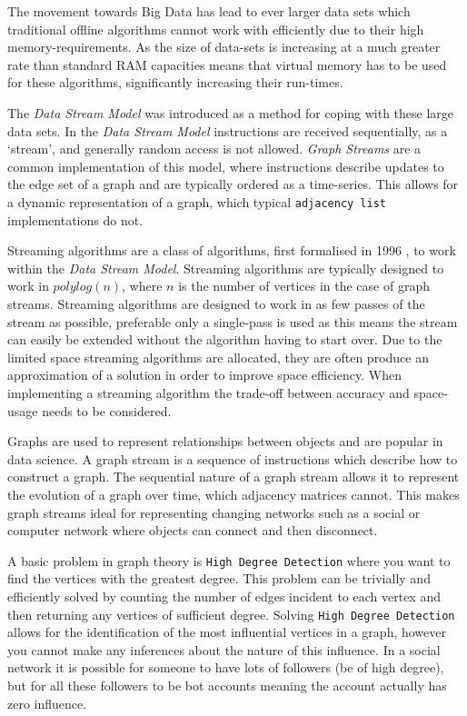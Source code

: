 \documentclass[11pt,twoside,a4paper]{report}
\begin{document}
\par The movement towards Big Data has lead to ever larger data sets which traditional offline algorithms cannot work with efficiently due to their high memory-requirements. As the size of data-sets is increasing at a much greater rate than standard RAM capacities means that virtual memory has to be used for these algorithms, significantly increasing their run-times.
\par The \textit{Data Stream Model} was introduced as a method for coping with these large data sets. In the \textit{Data Stream Model} instructions are received sequentially, as a `stream', and generally random access is not allowed. \textit{Graph Streams} are a common implementation of this model, where instructions describe updates to the edge set of a graph and are typically ordered as a time-series. This allows for a dynamic representation of a graph, which typical \texttt{adjacency list} implementations do not.
\par Streaming algorithms are a class of algorithms, first formalised in 1996 \cite{TODO}, to work within the \textit{Data Stream Model}. Streaming algorithms are typically designed to work in $polylog(n)$, where $n$ is the number of vertices in the case of graph streams. Streaming algorithms are designed to work in as few passes of the stream as possible, preferable only a single-pass is used as this means the stream can easily be extended without the algorithm having to start over. Due to the limited space streaming algorithms are allocated, they are often produce an approximation of a solution in order to improve space efficiency. When implementing a streaming algorithm the trade-off between accuracy and space-usage needs to be considered.

\par Graphs are used to represent relationships between objects and are popular in data science. A graph stream is a sequence of instructions which describe how to construct a graph. The sequential nature of a graph stream allows it to represent the evolution of a graph over time, which adjacency matrices cannot. This makes graph streams ideal for representing changing networks such as a social or computer network where objects can connect and then disconnect.

\par A basic problem in graph theory is \texttt{High Degree Detection} where you want to find the vertices with the greatest degree. This problem can be trivially and efficiently solved by counting the number of edges incident to each vertex and then returning any vertices of sufficient degree. Solving \texttt{High Degree Detection} allows for the identification of the most influential vertices in a graph, however you cannot make any inferences about the nature of this influence. In a social network it is possible for someone to have lots of followers (\ie be of high degree), but for all these followers to be bot accounts meaning the account actually has zero influence.
\end{document}
